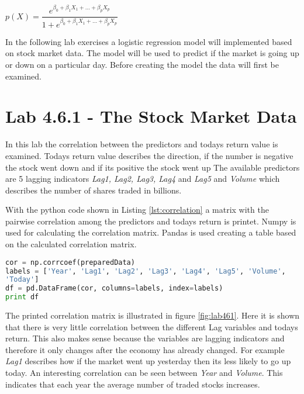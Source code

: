 \begin{center}
	$p(X) = \dfrac{e^{\beta_0 + \beta_1 X_1 + ... + \beta_p X_p}}{1 + e^{\beta_0 + \beta_1 X_1 + ... + \beta_p X_p}}$ 
\end{center}



In the following lab exercises a logistic regression model will implemented based on stock market data. The model will be used to predict if the market is going up or down on a particular day. Before creating the model the data will first be examined.

\section{Lab 4.6.1 - The Stock Market Data}
In this lab the correlation between the predictors and todays return value is examined. Todays return value describes the direction, if the number is negative the stock went down and if its positive the stock went up The available predictors are 5 lagging indicators \emph{Lag1, Lag2, Lag3, Lag4} and \emph{Lag5} and \emph{Volume} which describes the number of shares traded in billions.

With the python code shown in Listing \ref{lst:correlation} a matrix with the pairwise correlation among the predictors and todays return is printet. Numpy is used for calculating the correlation matrix. Pandas is used creating a table based on the calculated correlation matrix.
\begin{lstlisting}[language=Python, label=lst:correlation, caption=print correlation matrix]
cor = np.corrcoef(preparedData)
labels = ['Year', 'Lag1', 'Lag2', 'Lag3', 'Lag4', 'Lag5', 'Volume', 
'Today']
df = pd.DataFrame(cor, columns=labels, index=labels)
print df
\end{lstlisting}

The printed correlation matrix is illustrated in figure \ref{fig:lab461}. Here it is shown that there is very little correlation between the different Lag variables and todays return. This also makes sense because the variables are lagging indicators and therefore it only changes after the economy has already changed. For example \emph{Lag1} describes how if the market went up yesterday then its less likely to go up today. An interesting correlation can be seen between \emph{Year} and \emph{Volume}. This indicates that each year the average number of traded stocks increases. 

